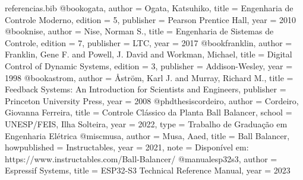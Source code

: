 
\begin{filecontents}[overwrite]{referencias.bib}
@book{ogata,
  author    = {Ogata, Katsuhiko},
  title     = {Engenharia de Controle Moderno},
  edition   = {5},
  publisher = {Pearson Prentice Hall},
  year      = {2010}
}
@book{nise,
  author    = {Nise, Norman S.},
  title     = {Engenharia de Sistemas de Controle},
  edition   = {7},
  publisher = {LTC},
  year      = {2017}
}
@book{franklin,
  author    = {Franklin, Gene F. and Powell, J. David and Workman, Michael},
  title     = {Digital Control of Dynamic Systems},
  edition   = {3},
  publisher = {Addison-Wesley},
  year      = {1998}
}
@book{astrom,
  author    = {{\AA}str{\"o}m, Karl J. and Murray, Richard M.},
  title     = {Feedback Systems: An Introduction for Scientists and Engineers},
  publisher = {Princeton University Press},
  year      = {2008}
}
@phdthesis{cordeiro,
  author = {Cordeiro, Giovanna Ferreira},
  title  = {Controle Cl{\'a}ssico da Planta Ball Balancer},
  school = {UNESP/FEIS, Ilha Solteira},
  year   = {2022},
  type   = {Trabalho de Gradua{\c c}{\~a}o em Engenharia El{\'e}trica}
}
@misc{musa,
  author       = {Musa, Aaed},
  title        = {Ball Balancer},
  howpublished = {Instructables},
  year         = {2021},
  note         = {Dispon{\'i}vel em: https://www.instructables.com/Ball-Balancer/}
}
@manual{esp32s3,
  author       = {{Espressif Systems}},
  title        = {ESP32-S3 Technical Reference Manual},
  year         = {2023}
}
\end{filecontents}

\documentclass[11pt,oneside,a4paper]{book}

\usepackage[utf8]{inputenc}
\usepackage[T1]{fontenc}
\usepackage[brazil]{babel}
\usepackage{lmodern}
\usepackage{microtype}

\usepackage{amsmath,amssymb,amsthm}
\usepackage{mathtools}

